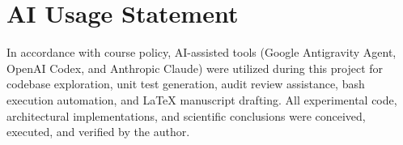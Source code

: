 \documentclass{article}
\begin{document}
\section*{AI Usage Statement}
In accordance with course policy, AI-assisted tools (Google Antigravity Agent, OpenAI Codex, and Anthropic Claude) were utilized during this project for codebase exploration, unit test generation, audit review assistance, bash execution automation, and LaTeX manuscript drafting. All experimental code, architectural implementations, and scientific conclusions were conceived, executed, and verified by the author.



\end{document}
